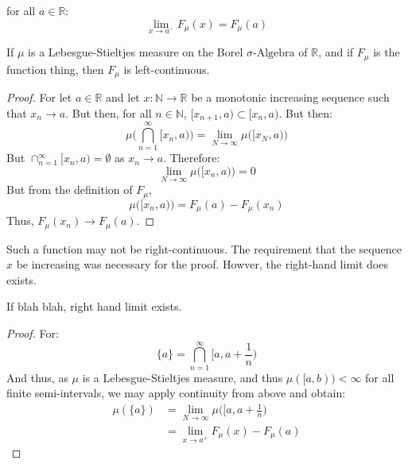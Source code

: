     for all $a\in\mathbb{R}$:
    \begin{equation}
        \underset{x\rightarrow{a}^{-}}{\lim}F_{\mu}(x)
        =F_{\mu}(a)
    \end{equation}
    \begin{theorem}
        If $\mu$ is a Lebesgue-Stieltjes measure on the
        Borel $\sigma\text{-Algebra}$ of $\mathbb{R}$, and if
        $F_{\mu}$ is the function thing, then $F_{\mu}$ is
        left-continuous.
    \end{theorem}
    \begin{proof}
        For let $a\in\mathbb{R}$ and let
        $x:\mathbb{N}\rightarrow\mathbb{R}$ be a monotonic
        increasing sequence such that $x_{n}\rightarrow{a}$.
        But then, for all $n\in\mathbb{N}$,
        $[x_{n+1},a)\subset[x_{n},a)$. But then:
        \begin{equation}
            \mu\Big(\bigcap_{n=1}^{\infty}[x_{n},a)\Big)
            =\underset{N\rightarrow\infty}{\lim}
            \mu\big([x_{N},a)\big)
        \end{equation}
        But $\cap_{n=1}^{\infty}[x_{n},a)=\emptyset$ as
        $x_{n}\rightarrow{a}$. Therefore:
        \begin{equation}
            \underset{N\rightarrow\infty}{\lim}
            \mu\big([x_{n},a)\big)=0
        \end{equation}
        But from the definition of $F_{\mu}$,
        \begin{equation}
            \mu\big([x_{n},a)\big)=F_{\mu}(a)-F_{\mu}(x_{n})
        \end{equation}
        Thus, $F_{\mu}(x_{n})\rightarrow{F}_{\mu}(a)$.
    \end{proof}
    Such a function may not be right-continuous. The requirement
    that the sequence $x$ be increasing was necessary for the
    proof. Howver, the right-hand limit does exists.
    \begin{theorem}
        If blah blah, right hand limit exists.
    \end{theorem}
    \begin{proof}
        For:
        \begin{equation}
            \{a\}=\bigcap_{n=1}^{\infty}[a,a+\frac{1}{n})
        \end{equation}
        And thus, as $\mu$ is a Lebesgue-Stieltjes measure,
        and thus $\mu([a,b))<\infty$ for all finite semi-intervals,
        we may apply continuity from above and obtain:
        \begin{align}
            \mu(\{a\})&=
            \underset{N\rightarrow\infty}{\lim}
            \mu\big([a,a+\frac{1}{n}\big)\\
            &=\underset{x\rightarrow{a}^{+}}{\lim}
            F_{\mu}(x)-F_{\mu}(a)
        \end{align}
    \end{proof}
